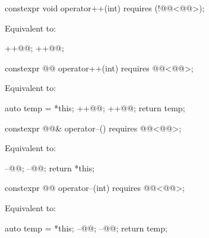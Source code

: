 \documentclass{wg21}
\begin{document}
\begin{addedblock}
\begin{itemdecl}
    constexpr void operator++(int) requires (!@@<@@>);
\end{itemdecl}

\begin{itemdescr}
    \pnum
    \effects
    Equivalent to:
    \begin{codeblock}
        ++@@;
        ++@@;
    \end{codeblock}
\end{itemdescr}

\begin{itemdecl}
    constexpr @@ operator++(int) requires @@<@@>;
\end{itemdecl}

\begin{itemdescr}
    \pnum
    \effects
    Equivalent to:
    \begin{codeblock}
        auto temp = *this;
        ++@@;
        ++@@;
        return temp;
    \end{codeblock}
\end{itemdescr}

\begin{itemdecl}
    constexpr @@& operator--() requires @@<@@>;
\end{itemdecl}

\begin{itemdescr}
    \pnum
    \effects
    Equivalent to:
    \begin{codeblock}
        --@@;
        --@@;
        return *this;
    \end{codeblock}
\end{itemdescr}

\begin{itemdecl}
    constexpr @@ operator--(int) requires @@<@@>;
\end{itemdecl}

\begin{itemdescr}
    \pnum
    \effects
    Equivalent to:
    \begin{codeblock}
        auto temp = *this;
        --@@;
        --@@;
        return temp;
    \end{codeblock}
\end{itemdescr}


\end{addedblock}
\end{document}
